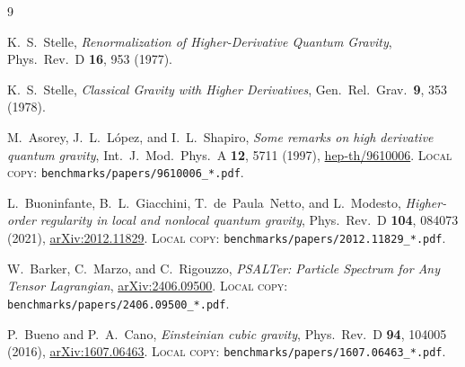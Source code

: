 \documentclass[aps,prd,twocolumn,superscriptaddress,nofootinbib]{revtex4-2}
\begin{document}
\begin{thebibliography}{9}

K.~S.~Stelle,
\emph{Renormalization of Higher-Derivative Quantum Gravity},
Phys.\ Rev.\ D \textbf{16}, 953 (1977).

K.~S.~Stelle,
\emph{Classical Gravity with Higher Derivatives},
Gen.\ Rel.\ Grav.\ \textbf{9}, 353 (1978).

M.~Asorey, J.~L.~L\'opez, and I.~L.~Shapiro,
\emph{Some remarks on high derivative quantum gravity},
Int.\ J.\ Mod.\ Phys.\ A \textbf{12}, 5711 (1997),
\href{https://arxiv.org/abs/hep-th/9610006}{hep-th/9610006}.
\textsc{Local copy:} \texttt{benchmarks/papers/9610006\_*.pdf}.

L.~Buoninfante, B.~L.~Giacchini, T.~de~Paula~Netto, and L.~Modesto,
\emph{Higher-order regularity in local and nonlocal quantum gravity},
Phys.\ Rev.\ D \textbf{104}, 084073 (2021),
\href{https://arxiv.org/abs/2012.11829}{arXiv:2012.11829}.
\textsc{Local copy:} \texttt{benchmarks/papers/2012.11829\_*.pdf}.

W.~Barker, C.~Marzo, and C.~Rigouzzo,
\emph{PSALTer: Particle Spectrum for Any Tensor Lagrangian},
\href{https://arxiv.org/abs/2406.09500}{arXiv:2406.09500}.
\textsc{Local copy:} \texttt{benchmarks/papers/2406.09500\_*.pdf}.

P.~Bueno and P.~A.~Cano,
\emph{Einsteinian cubic gravity},
Phys.\ Rev.\ D \textbf{94}, 104005 (2016),
\href{https://arxiv.org/abs/1607.06463}{arXiv:1607.06463}.
\textsc{Local copy:} \texttt{benchmarks/papers/1607.06463\_*.pdf}.

\end{thebibliography}
\end{document}

